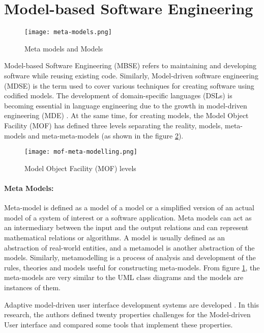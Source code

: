 \section{Model-based Software Engineering}
\label{background:section:mbse}
\begin{figure}[htbp!]
  \centering    
  \texttt{[image: meta-models.png]}
  \caption[Meta models]{Meta models and Models}
  \label{fig:background:m1m2}
\end{figure}

Model-based Software Engineering (MBSE) refers to maintaining and developing software while reusing existing code.
Similarly, Model-driven software engineering (MDSE) is the term used to cover various techniques for creating software using codified models.
The development of domain-specific languages (DSLs) is becoming essential in language engineering due to the growth in model-driven engineering (MDE) \cite{article:mbse:cuadrado}.
At the same time, for creating models, the Model Object Facility (MOF) has defined three levels separating the reality, models, meta-models and meta-meta-models (as shown in the figure \ref{fig:background:moflevels}).
\begin{figure}[htbp!]
  \centering    
  \texttt{[image: mof-meta-modelling.png]}
  \caption[MOF levels]{Model Object Facility (MOF) levels}
  \label{fig:background:moflevels}
\end{figure}
\paragraph{Meta Models:} Meta-model is defined as a model of a model or a simplified version of an actual model of a system of interest or a software application.
Meta models can act as an intermediary between the input and the output relations and can represent mathematical relations or algorithms.
A model is usually defined as an abstraction of real-world entities, and a metamodel is another abstraction of the models. 
Similarly, metamodelling is a process of analysis and development of the rules, theories and models useful for constructing meta-models.
From figure \ref{fig:background:m1m2}, the meta-models are very similar to the UML class diagrams and the models are instances of them. 

Adaptive model-driven user interface development systems are developed \cite{article:mbse:akiki}.
In this research, the authors defined twenty properties challenges for the Model-driven User interface and compared some tools that implement these properties.

